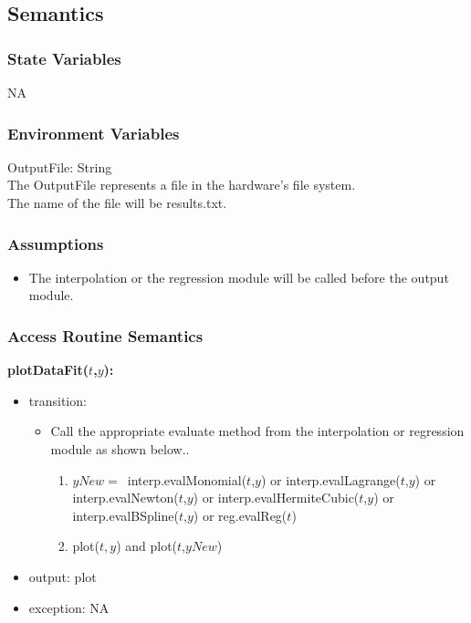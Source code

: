 \documentclass[12pt, titlepage]{article}
\begin{document}
\subsection{Semantics}

\subsubsection{State Variables}
NA


\subsubsection{Environment Variables}


OutputFile: String\\

\noindent The OutputFile represents a file in the hardware's file system.\\

\noindent The name of the file will be results.txt.\\



\subsubsection{Assumptions}

\begin{itemize}
	
	\item The interpolation or the regression module will be called before the 
	output module.
	
\end{itemize}
\subsubsection{Access Routine Semantics}



\noindent \textbf{plotDataFit($t$,$y$):}
\begin{itemize}
	\item transition: 
	\begin{itemize}
		\item Call the appropriate evaluate method from the interpolation or 
		regression module as shown below..
		
		\begin{enumerate}
			
			\item $yNew = $\ interp.evalMonomial($t$,$y$) or
			interp.evalLagrange($t$,$y$) or
			interp.evalNewton($t$,$y$) or
			interp.evalHermiteCubic($t$,$y$) or
			interp.evalBSpline($t$,$y$) or
			reg.evalReg($t$)
			
			\item plot($t,y$) and plot($t$,$yNew$)
\end{enumerate}	
	\end{itemize}

	\item output:  plot
	
	\item exception: NA
\end{itemize}
\end{document}
